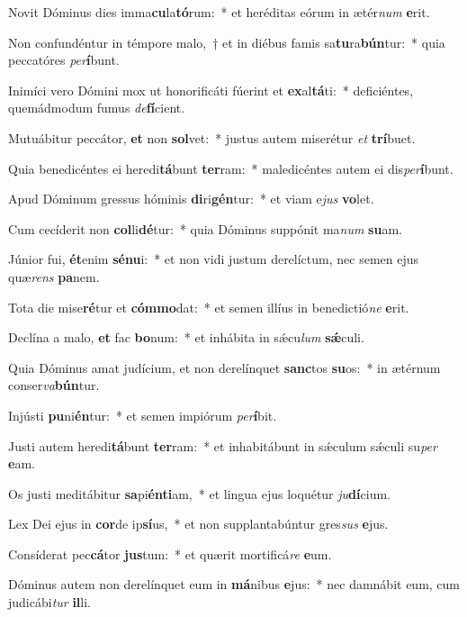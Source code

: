 \item Novit Dóminus dies imma\textbf{cu}la\textbf{tó}rum:~* et heréditas eórum in ætér\textit{num} \textbf{e}rit.
\item Non confundéntur in témpore malo,~† et in diébus famis sa\textbf{tu}ra\textbf{bún}tur:~* quia peccatóres \textit{per}\textbf{í}bunt.
\item Inimíci vero Dómini mox ut honorificáti fúerint et \textbf{ex}al\textbf{tá}ti:~* deficiéntes, quemádmodum fumus \textit{de}\textbf{fí}cient.
\item Mutuábitur peccátor, \textbf{et} non \textbf{sol}vet:~* justus autem miserétur \textit{et} \textbf{trí}buet.
\item Quia benedicéntes ei heredi\textbf{tá}bunt \textbf{ter}ram:~* maledicéntes autem ei dis\textit{per}\textbf{í}bunt.
\item Apud Dóminum gressus hóminis \textbf{di}ri\textbf{gén}tur:~* et viam e\textit{jus} \textbf{vo}let.
\item Cum cecíderit non \textbf{col}li\textbf{dé}tur:~* quia Dóminus suppónit ma\textit{num} \textbf{su}am.
\item Júnior fui, \textbf{ét}enim \textbf{sé}\textbf{nu}i:~* et non vidi justum derelíctum, nec semen ejus quæ\textit{rens} \textbf{pa}nem.
\item Tota die mise\textbf{ré}tur et \textbf{cóm}\textbf{mo}dat:~* et semen illíus in benedictió\textit{ne} \textbf{e}rit.
\item Declína a malo, \textbf{et} fac \textbf{bo}num:~* et inhábita in sǽcu\textit{lum} \textbf{sǽ}culi.
\item Quia Dóminus amat judícium, et non derelínquet \textbf{sanc}tos \textbf{su}os:~* in ætérnum conser\textit{va}\textbf{bún}tur.
\item Injústi \textbf{pu}ni\textbf{én}tur:~* et semen impiórum \textit{per}\textbf{í}bit.
\item Justi autem heredi\textbf{tá}bunt \textbf{ter}ram:~* et inhabitábunt in sǽculum sǽculi su\textit{per} \textbf{e}am.
\item Os justi meditábitur \textbf{sa}pi\textbf{én}\textbf{ti}am,~* et lingua ejus loquétur \textit{ju}\textbf{dí}cium.
\item Lex Dei ejus in \textbf{cor}de ip\textbf{sí}us,~* et non supplantabúntur gres\textit{sus} \textbf{e}jus.
\item Consíderat pec\textbf{cá}tor \textbf{jus}tum:~* et quærit mortificá\textit{re} \textbf{e}um.
\item Dóminus autem non derelínquet eum in \textbf{má}nibus \textbf{e}jus:~* nec damnábit eum, cum judicábi\textit{tur} \textbf{il}li.
